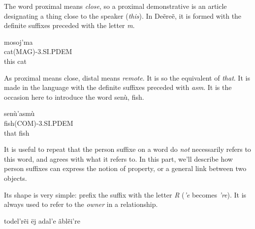 The word proximal means \emph{close}, so a proximal demonstrative is an article designating a thing
close to the speaker (\emph{this}). In Deẽreẽ, it is formed with the definite suffixes preceded with
the letter \emph{m}.

\begin{exe}
\ex\label{exe:person-prox-dem}
\gll mosoj’ma\\
cat(MAG)-3.SI.PDEM\\
\trans this cat
\end{exe}

As proximal means close, distal means \emph{remote}. It is so the equivalent of \emph{that}. It is
made in the language with the definite suffixes preceded with \emph{asm}. It is the occasion here to
introduce the word \gls{senù}, fish.

\begin{exe}
\ex\label{exe:person-dist-dem}
\gll \gls{senù}’asmù\\
fish(COM)-3.SI.PDEM\\
\trans that fish
\end{exe}

It is useful to repeat that the person suffixe on a word do \emph{not} necessarily refers to this
word, and agrees with what it refers to. In this part, we’ll describe how person suffixes can
express the notion of property, or a general link between two objects.

Its shape is very simple: prefix the suffix with the letter \emph{R} (\emph{’e} becomes \emph{’re}).
It is always used to refer to the \emph{owner} in a relationship.

todel’rẽi
ëj adal’e ãblẽi’re

